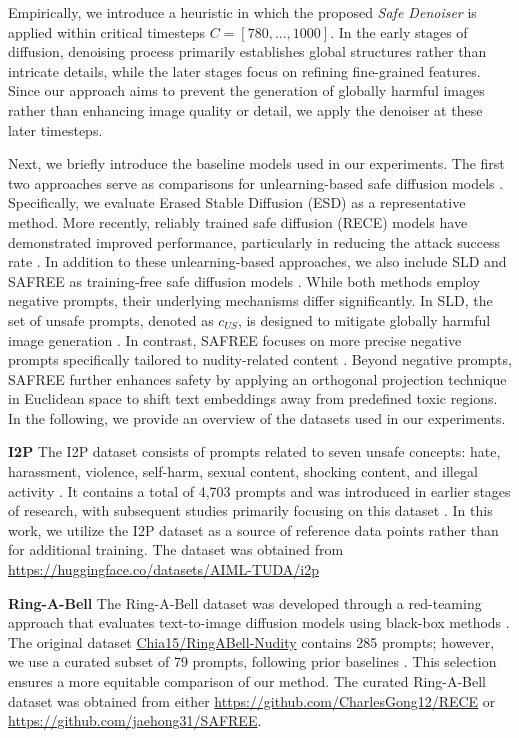 Empirically, we introduce a heuristic in which the proposed \textit{Safe Denoiser} is applied within critical timesteps $C=[780, ...,1000]$. %
In the early stages of diffusion, denoising process primarily establishes global structures rather than intricate details, while the later stages focus on refining fine-grained features. Since our approach aims to prevent the generation of globally harmful images rather than enhancing image quality or detail, we apply the denoiser at these later timesteps. 

Next, we briefly introduce the baseline models used in our experiments.
The first two approaches serve as comparisons for unlearning-based safe diffusion models \cite{gandikota2023erasing, gong2024reliable}.  
Specifically, we evaluate Erased Stable Diffusion (ESD) \cite{gandikota2023erasing} as a representative method. More recently, reliably trained safe diffusion (RECE) models have demonstrated improved performance, particularly in reducing the attack success rate \cite{gong2024reliable}. 
In addition to these unlearning-based approaches, we also include SLD and SAFREE as training-free safe diffusion models \cite{schramowski2023safe, yoon2024safree}. While both methods employ negative prompts, their underlying mechanisms differ significantly. 
In SLD, the set of unsafe prompts, denoted as  $c_{US}$, is designed to mitigate globally harmful image generation \cite{schramowski2023safe}.
In contrast, SAFREE focuses on more precise negative prompts specifically tailored to nudity-related content \cite{yoon2024safree}. Beyond negative prompts, SAFREE further enhances safety by applying an orthogonal projection technique in Euclidean space to shift text embeddings away from predefined toxic regions.
In the following, we provide an overview of the datasets used in our experiments.

\textbf{I2P}  
The I2P dataset consists of prompts related to seven unsafe concepts: hate, harassment, violence, self-harm, sexual content, shocking content, and illegal activity \cite{schramowski2023safe}. 
It contains a total of 4,703 prompts and was introduced in earlier stages of research, with subsequent studies primarily focusing on this dataset \cite{gong2024reliable, yoon2024safree}. 
In this work, we utilize the I2P dataset as a source of reference data points rather than for additional training.
The dataset was obtained from \url{https://huggingface.co/datasets/AIML-TUDA/i2p}

\textbf{Ring-A-Bell}
The Ring-A-Bell dataset was developed through a red-teaming approach that evaluates text-to-image diffusion models using black-box methods \cite{tsai2024ringabell}. 
The original dataset \url{Chia15/RingABell-Nudity} contains 285 prompts; however, we use a curated subset of 79 prompts, following prior baselines \cite{gong2024reliable, yoon2024safree}. 
This selection ensures a more equitable comparison of our method. 
The curated Ring-A-Bell dataset was obtained from either \url{https://github.com/CharlesGong12/RECE} or \url{https://github.com/jaehong31/SAFREE}.

